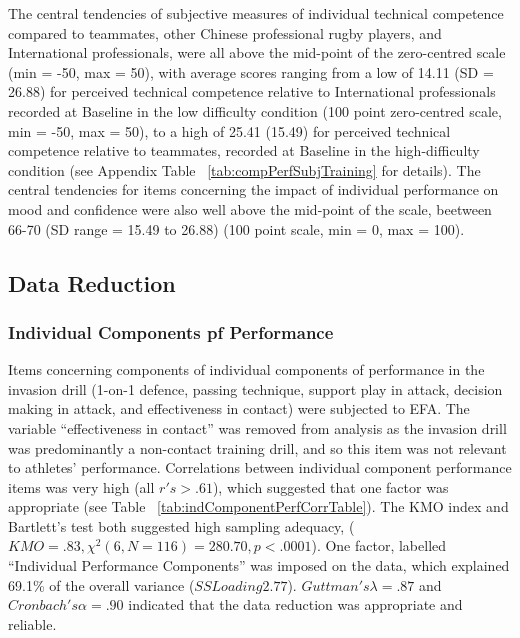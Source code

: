 





The central tendencies of subjective measures of individual technical competence compared to teammates, other Chinese professional rugby players, and International professionals, were all above the mid-point of the zero-centred scale (min = -50, max = 50), with average scores ranging from  a low of 14.11 (SD = 26.88) for perceived technical competence relative to International professionals recorded at Baseline in the low difficulty condition (100 point zero-centred scale, min = -50, max = 50), to a high of 25.41 (15.49) for perceived technical competence relative to teammates, recorded at Baseline in the high-difficulty condition (see Appendix Table ~\ref{tab:compPerfSubjTraining} for details).  The central tendencies for items concerning the impact of individual performance on mood and confidence were also well above the mid-point of the scale, beetween 66-70 (SD range = 15.49 to 26.88) (100 point scale, min = 0, max = 100).


\subsection{Data Reduction\label{app6:dataReduction}}


\subsubsection{Individual Components pf Performance\label{app6:dataReductionPerformance}}
Items concerning components of individual components of performance in the invasion drill (1-on-1 defence, passing technique, support play in attack, decision making in attack, and effectiveness in contact) were subjected to EFA.  The variable ``effectiveness in contact'' was removed from analysis as the invasion drill was predominantly a non-contact training drill, and so this item was not relevant to athletes' performance.  Correlations between individual component performance items was very high (all $r's > .61$), which suggested that one factor was appropriate (see Table ~\ref{tab:indComponentPerfCorrTable}).
The KMO index and Bartlett's test both suggested high sampling adequacy, ($KMO = .83, \chi^2(6, N = 116) = 280.70, p < .0001$). One factor, labelled ``Individual Performance Components'' was imposed on the data, which explained 69.1\% of the overall variance ($SS Loading  2.77$).  $Guttman's \lambda = .87$  and  $Cronbach's \alpha = .90$ indicated that the data reduction was appropriate and reliable.


